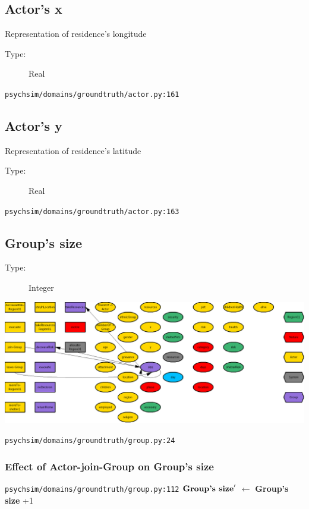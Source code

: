 \documentclass{article}%
\begin{document}
%
\subsection{Actor's x}%
\label{subsec:Actor's x}%
Representation of residence's longitude%
\begin{description}%
\item[Type:]%
Real%
\end{description}%
\begin{flushleft}%
\verb|psychsim/domains/groundtruth/actor.py:161|%
\end{flushleft}

%
\subsection{Actor's y}%
\label{subsec:Actor's y}%
Representation of residence's latitude%
\begin{description}%
\item[Type:]%
Real%
\end{description}%
\begin{flushleft}%
\verb|psychsim/domains/groundtruth/actor.py:163|%
\end{flushleft}

%
\subsection{Group's size}%
\label{subsec:Group's size}%
\begin{description}%
\item[Type:]%
Integer%
\end{description}%
\includegraphics[width=\textwidth]{images/sizeOfGroup.png}%
\begin{flushleft}%
\verb|psychsim/domains/groundtruth/group.py:24|%
\end{flushleft}%
\subsubsection{Effect of Actor{-}join{-}Group on Group's size}%
\label{ssubsec:Effect of Actor{-}join{-}Group on Group's size}%
\begin{flushleft}%
\verb|psychsim/domains/groundtruth/group.py:112|%
\linebreak%
$\mbox{\textbf{Group's size}} '$%
$\leftarrow$%
\textbf{Group's size}%
+1%
\end{flushleft}
\end{document}
